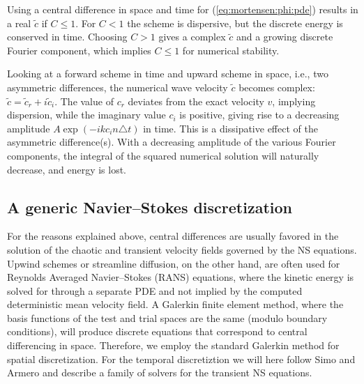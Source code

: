 Using a central difference in space and time for (\eqref{eq:mortensen:phi:pde})
results in a real $\tilde c$ if $C\leq 1$.
For $C<1$ the scheme is dispersive, but
the discrete energy  is conserved in time.
Choosing $C>1$ gives a complex $\tilde c$ and a growing discrete Fourier
component, which implies $C\leq1$ for numerical stability.

Looking at a forward scheme in time and upward scheme in space, i.e.,
two asymmetric differences, the numerical wave velocity $\tilde c$ becomes
complex: $\tilde c = \tilde c_r + i\tilde c_i$. 
The value of $c_r$ deviates from the exact velocity $v$, implying
dispersion, while the imaginary value $c_i$ is positive, giving rise
to a decreasing amplitude $A\exp{(-ikc_i n\triangle t)}$ in time.
This is a dissipative effect of the asymmetric difference(s). 
With a decreasing amplitude of the various
Fourier components, the integral of the squared numerical solution will
naturally decrease, and energy is lost.


\subsection{A generic Navier--Stokes discretization}
\label{sec:mortensen:NS-solver}

For the reasons explained above, central differences are
usually favored in the solution of the chaotic and transient velocity
fields governed by the NS equations. Upwind schemes or streamline
diffusion, on the other hand, are often used for Reynolds Averaged
Navier--Stokes (RANS) equations, where the kinetic energy is solved for
through a separate PDE and not implied by the computed deterministic
mean velocity field. A Galerkin finite element method, where the basis functions
of the test and trial spaces are the same (modulo boundary conditions),
will produce discrete equations that correspond to central differencing 
in space. Therefore, we employ the standard Galerkin method for spatial
discretization. For the temporal
discretiztion we will here follow Simo and Armero \cite{simo94} and describe a family of solvers for the transient NS equations.

